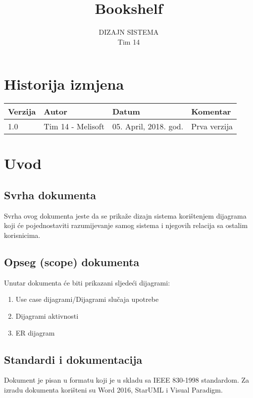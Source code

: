 \documentclass[a4paper oneside ,12pt]{article}
\begin{document}
 
\title{\textbf{Bookshelf} \\ }
\author{DIZAJN SISTEMA \\ Tim 14} 
\maketitle  
\thispagestyle{empty}
\hfill \break 
\renewcommand*\contentsname{Sadržaj}

\newpage
\section*{Historija izmjena}
\begin{table}[H]
\centering
\begin{tabular}{|l|l|l|l|}
\hline
Verzija & Autor             & Datum                & Komentar     \\ \hline
1.0     & Tim 14 - Melisoft & 05. April, 2018. god. & Prva verzija \\ \hline
\end{tabular}
\end{table}


\newpage
\tableofcontents

\newpage
\section{Uvod}
\subsection{Svrha dokumenta}
Svrha ovog dokumenta jeste da se prikaže dizajn sistema korištenjem dijagrama koji će pojednostaviti razumijevanje samog sistema i njegovih relacija sa ostalim korisnicima. \par

\subsection{Opseg (scope) dokumenta}
Unutar dokumenta će biti prikazani sljedeći dijagrami:
\begin{enumerate}
    \item Use case dijagrami/Dijagrami slučaja upotrebe
    \item Dijagrami aktivnosti
    \item ER dijagram
\end{enumerate}

\subsection{Standardi i dokumentacija}
Dokument je pisan u formatu koji je u skladu sa IEEE 830-1998 standardom. Za izradu dokumenta korišteni su Word 2016, StarUML i Visual Paradigm.\par
\end{document}
